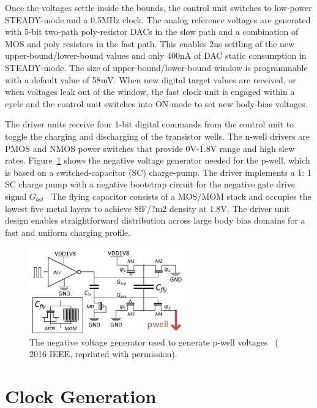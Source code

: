 \documentclass[graybox]{svmult}
\begin{document}
Once the voltages settle inside the bounds, the control unit switches to low-power STEADY-mode and a 0.5MHz clock.
The analog reference voltages are generated with 5-bit two-path poly-resistor DACs in the slow path and a combination of MOS and poly resistors in the fast path.
This enables 2ns settling of the new upper-bound/lower-bound values and only 400nA of DAC static consumption in STEADY-mode.
The size of upper-bound/lower-bound window is programmable with a default value of 58mV.
When new digital target values are received, or when voltages leak out of the window, the fast clock unit is engaged within a cycle and the control unit switches into ON-mode to set new body-bias voltages.

The driver units receive four 1-bit digital commands from the control unit to toggle the charging and discharging of the transistor wells.
The n-well drivers are PMOS and NMOS power switches that provide 0V-1.8V range and high slew rates.
Figure~\ref{fig:bbgen-negative-vgen} shows the negative voltage generator needed for the p-well, which is based on a switched-capacitor (SC) charge-pump.
The driver implements a 1: 1 SC charge pump with a negative bootstrap circuit for the negative gate drive signal $G_{bot}$~\cite{Tsukikawa1993}
The flying capacitor consists of a MOS/MOM stack and occupies the lowest five metal layers to achieve 8fF/?m2 density at 1.8V.
The driver unit design enables straightforward distribution across large body bias domains for a fast and uniform charging profile.

\begin{figure}
  \centering
  \includegraphics[width=0.6\textwidth]{bbgen-negative-vgen}
  \caption{The negative voltage generator used to generate p-well voltages~\cite{Blagojevic2016} ({\textcopyright} 2016 IEEE, reprinted with permission).}
  \label{fig:bbgen-negative-vgen}
\end{figure}

\section{Clock Generation}
\end{document}
